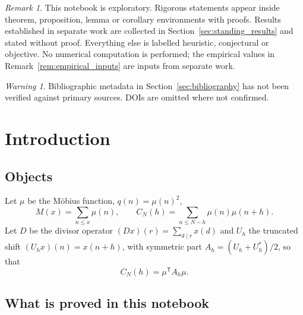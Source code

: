 \documentclass[11pt]{amsart}
\numberwithin{equation}{section}
\theoremstyle{plain}
\theoremstyle{definition}
\theoremstyle{remark}
\newtheorem{remark}[theorem]{Remark}
\newtheorem{warning}[theorem]{Warning}
\begin{document}
\tableofcontents

\bigskip

\begin{remark}
\label{rem:exploratory_nature}
This notebook is exploratory. Rigorous statements appear inside theorem,
proposition, lemma or corollary environments with proofs. Results
established in separate work are collected in
Section~\ref{sec:standing_results} and stated without proof. Everything
else is labelled heuristic, conjectural or objective. No numerical
computation is performed; the empirical values in
Remark~\ref{rem:empirical_inputs} are inputs from separate work.
\end{remark}

\begin{warning}
\label{warn:bibliographic_metadata}
Bibliographic metadata in Section~\ref{sec:bibliography} has not been
verified against primary sources. DOIs are omitted where not confirmed.
\end{warning}

\section{Introduction}
\label{sec:introduction}

\subsection{Objects}
\label{subsec:objects}

Let $\mu$ be the M\"obius function, $q(n)=\mu(n)^2$,
\begin{equation}
M(x)=\sum_{n\le x}\mu(n),
\qquad
C_N(h)=\sum_{n\le N-h}\mu(n)\mu(n+h).
\label{eq:mertens_and_correlation}
\end{equation}
Let $D$ be the divisor operator $(Dx)(r)=\sum_{d\mid r}x(d)$ and $U_h$
the truncated shift $(U_hx)(n)=x(n+h)$, with symmetric part
$A_h=(U_h+U_h^{*})/2$, so that
\begin{equation}
C_N(h)=\mu^{\mathsf T}A_h\mu .
\label{eq:correlation_as_form}
\end{equation}

\subsection{What is proved in this notebook}
\label{subsec:what_is_proved}
\end{document}
